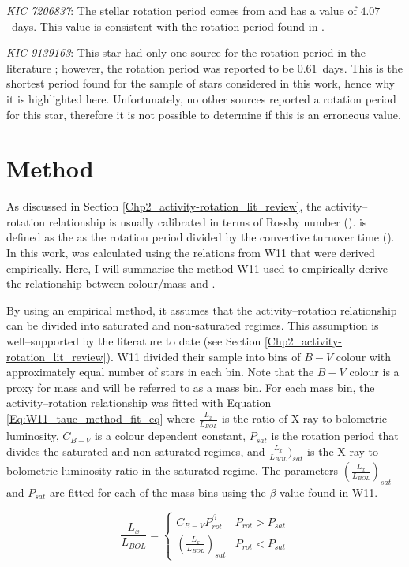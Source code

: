 \textit{KIC 7206837}: The stellar rotation period comes from \citet{McQuillan_etal_2014} and has a value of $4.07$~days. This value is consistent with the rotation period found in \citet{Nielsen_etal_2013}.

\textit{KIC 9139163}: This star had only one source for the rotation period in the literature \citep{Janes_2017}; however, the rotation period was reported to be $0.61$~days. This is the shortest period found for the sample of stars considered in this work, hence why it is highlighted here. Unfortunately, no other sources reported a rotation period for this star, therefore it is not possible to determine if this is an erroneous value.

\section{Method}
\label{Chp5_method}

As discussed in Section \ref{Chp2_activity-rotation_lit_review}, the activity--rotation relationship is usually calibrated in terms of Rossby number (\Ro). \Ro is defined as the as the rotation period divided by the convective turnover time (\tauc). In this work, \tauc was calculated using the relations from W11 that were derived empirically. Here, I will summarise the method W11 used to empirically derive the relationship between colour/mass and \tauc.

By using an empirical method, it assumes that the activity--rotation relationship can be divided into saturated and non-saturated regimes. This assumption is well--supported by the literature to date (see Section \ref{Chp2_activity-rotation_lit_review}). W11 divided their sample into bins of $B-V$ colour with approximately equal number of stars in each bin. Note that the $B-V$ colour is a proxy for mass and will be referred to as a mass bin. For each mass bin, the activity--rotation relationship was fitted with Equation \ref{Eq:W11_tauc_method_fit_eq} where $\frac{L_{x}}{L_{BOL}}$ is the ratio of X-ray to bolometric luminosity, $C_{B-V}$ is a colour dependent constant, $P_{sat}$ is the rotation period that divides the saturated and non-saturated regimes, and $\frac{L_{x}}{L_{BOL}})_{sat}$ is the X-ray to bolometric luminosity ratio in the saturated regime. The parameters $(\frac{L_{x}}{L_{BOL}})_{sat}$ and $P_{sat}$ are fitted for each of the mass bins using the $\beta$ value found in W11.

\begin{equation}
    \frac{L_{x}}{L_{BOL}} = 
    \begin{cases}
        C_{B-V}P_{rot}^{\beta} & P_{rot} > P_{sat} \\
        (\frac{L_{x}}{L_{BOL}})_{sat} & P_{rot} < P_{sat}
    \end{cases}
    \label{Eq:W11_tauc_method_fit_eq}
\end{equation}

